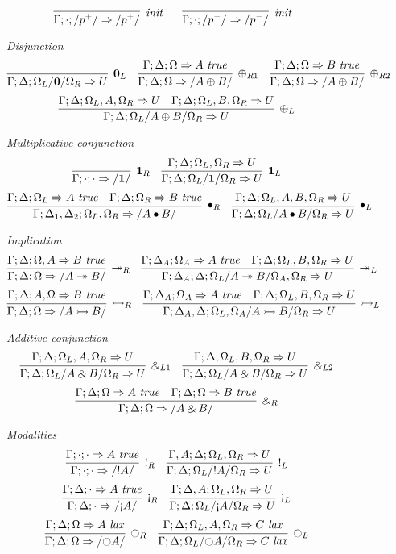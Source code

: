 \begin{figure}
\small
\[
\infer[{\it init}^+]
{\oiseq{\Gamma}{p^+}}
{}
\quad
\infer[{\it init}^-]
{\oiseq{\Gamma}{p^-}}
{}
\]

\medskip
{\it Disjunction}
\[
\infer[{\zero}_L]
{\olseq{\Gamma}{\Delta}{\Omega_L}{\zero}{\Omega_R}}
{}
\quad
\infer[{\oplus}_{R1}]
{\orseq{\Gamma}{\Delta}{\Omega}{A \oplus B}}
{\otseq{\Gamma}{\Delta}{\Omega}{A}}
\quad
\infer[{\oplus}_{R2}]
{\orseq{\Gamma}{\Delta}{\Omega}{A \oplus B}}
{\otseq{\Gamma}{\Delta}{\Omega}{B}}
\]
\[
\infer[{\oplus}_{L}]
{\olseq{\Gamma}{\Delta}{\Omega_L}{A \oplus B}{\Omega_R}}
{\opseq{\Gamma}{\Delta}{\Omega_L}{A,\Omega_R}
 &
 \opseq{\Gamma}{\Delta}{\Omega_L}{B,\Omega_R}}
\]

\medskip
{\it Multiplicative conjunction}
\[
\infer[{\one}_R]
{\orseq{\Gamma}{\cdot}{\cdot}{\one}}
{}
\quad
\infer[{\one}_L]
{\olseq{\Gamma}{\Delta}{\Omega_L}{\one}{\Omega_R}}
{\opseq{\Gamma}{\Delta}{\Omega_L}{\Omega_R}}
\]
\[
\infer[{\fuse}_R]
{\orseq{\Gamma}{\Delta_1,\Delta_2}{\Omega_L,\Omega_R}{A \fuse B}}
{\otseq{\Gamma}{\Delta}{\Omega_L}{A}
 &
 \otseq{\Gamma}{\Delta}{\Omega_R}{B}}
\quad
\infer[{\fuse}_L]
{\olseq{\Gamma}{\Delta}{\Omega_L}{A \fuse B}{\Omega_R}}
{\opseq{\Gamma}{\Delta}{\Omega_L}{A,B,\Omega_R}}
\]

\medskip
{\it Implication}
\[
\infer[{\righti}_R]
{\orseq{\Gamma}{\Delta}{\Omega}{A \righti B}}
{\otseq{\Gamma}{\Delta}{\Omega, A}{B}}
\quad
\infer[{\righti}_L]
{\olseq{\Gamma}{\Delta_A, \Delta}{\Omega_L}{A \righti B}{\Omega_A, \Omega_R}}
{\otseq{\Gamma}{\Delta_A}{\Omega_A}{A}
 &
 \opseq{\Gamma}{\Delta}{\Omega_L}{B, \Omega_R}}
\]
\[
\infer[{\lefti}_R]
{\orseq{\Gamma}{\Delta}{\Omega}{A \lefti B}}
{\otseq{\Gamma}{\Delta}{A, \Omega}{B}}
\quad
\infer[{\lefti}_L]
{\olseq{\Gamma}{\Delta_A, \Delta}{\Omega_L, \Omega_A}{A \lefti B}{\Omega_R}}
{\otseq{\Gamma}{\Delta_A}{\Omega_A}{A}
 &
 \opseq{\Gamma}{\Delta}{\Omega_L}{B,\Omega_R}}
\]

\medskip
{\it Additive conjunction}
\[
\infer[{\with}_{L1}]
{\olseq{\Gamma}{\Delta}{\Omega_L}{A \with B}{\Omega_R}}
{\opseq{\Gamma}{\Delta}{\Omega_L}{A, \Omega_R}}
\quad
\infer[{\with}_{L2}]
{\olseq{\Gamma}{\Delta}{\Omega_L}{A \with B}{\Omega_R}}
{\opseq{\Gamma}{\Delta}{\Omega_L}{B, \Omega_R}}
\]
\[
\infer[{\with}_R]
{\orseq{\Gamma}{\Delta}{\Omega}{A \with B}}
{\otseq{\Gamma}{\Delta}{\Omega}{A}
 &
 \otseq{\Gamma}{\Delta}{\Omega}{B}}
\]

\medskip
{\it Modalities}
\[
\infer[{!}_R]
{\orseq{\Gamma}{\cdot}{\cdot}{{!}A}}
{\otseq{\Gamma}{\cdot}{\cdot}{A}}
\quad
\infer[{!}_L]
{\olseq{\Gamma}{\Delta}{\Omega_L}{{!}A}{\Omega_R}}
{\opseq{\Gamma,A}{\Delta}{\Omega_L}{\Omega_R}}
\]
\[
\infer[{\gnab}_R]
{\orseq{\Gamma}{\Delta}{\cdot}{{\gnab}A}}
{\otseq{\Gamma}{\Delta}{\cdot}{A}}
\quad
\infer[{\gnab}_L]
{\olseq{\Gamma}{\Delta}{\Omega_L}{{\gnab}A}{\Omega_R}}
{\opseq{\Gamma}{\Delta, A}{\Omega_L}{\Omega_R}}
\]
\[
\infer[{\ocircle}_R]
{\orseq{\Gamma}{\Delta}{\Omega}{{\ocircle}A}}
{\oseq{\Gamma}{\Delta}{\Omega}{\islax{A}}}
\quad
\infer[{\ocircle}_L]
{\oseq{\Gamma}{\Delta}{\Omega_L /{\ocircle}A/ \Omega_R}{\islax{C}}}
{\oseq{\Gamma}{\Delta}{\Omega_L, A, \Omega_R}{\islax{C}}}
\]


\end{figure}
